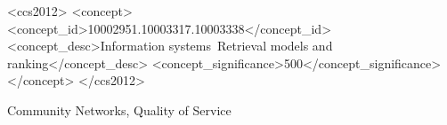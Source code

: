 \documentclass[plain]{sigplanconf}
\begin{document}
	\begin{CCSXML}
		<ccs2012>
		<concept>
		<concept_id>10002951.10003317.10003338</concept_id>
		<concept_desc>Information systems~Retrieval models and ranking</concept_desc>
		<concept_significance>500</concept_significance>
		</concept>
		</ccs2012>
	\end{CCSXML}
	\keywords
	Community Networks, Quality of Service
	
	
	
	
	
	
	
	
	
	
\end{document}
